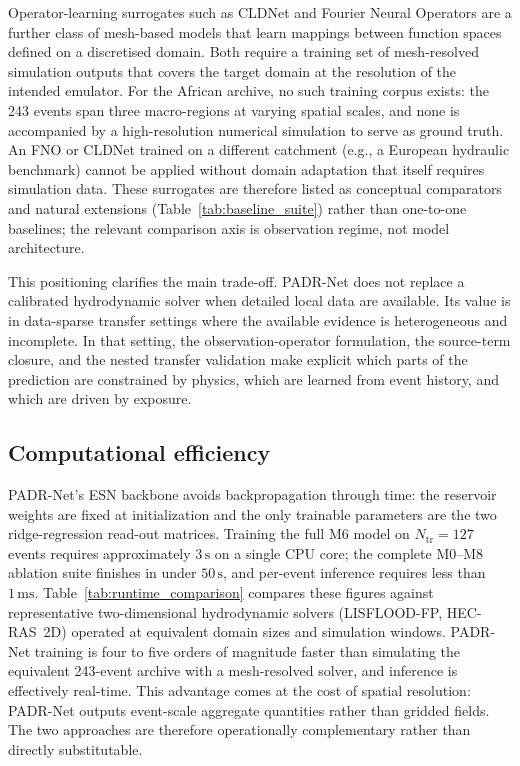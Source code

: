 \documentclass[pdflatex,sn-mathphys-ay]{sn-jnl}
\theoremstyle{thmstyleone}
\begin{document}
Operator-learning surrogates such as CLDNet
\citep[e.g.,][]{YANG2026103056} and Fourier Neural Operators
\citep{li2021fourier} are a further class of mesh-based models that
learn mappings between function spaces defined on a discretised domain.
Both require a training set of mesh-resolved simulation outputs that
covers the target domain at the resolution of the intended emulator.
For the African archive, no such training corpus exists: the 243 events
span three macro-regions at varying spatial scales, and none is
accompanied by a high-resolution numerical simulation to serve as
ground truth.  An FNO or CLDNet trained on a different catchment (e.g.,
a European hydraulic benchmark) cannot be applied without domain
adaptation that itself requires simulation data.  These surrogates are
therefore listed as conceptual comparators and natural extensions
(Table~\ref{tab:baseline_suite}) rather than one-to-one baselines;
the relevant comparison axis is observation regime, not model
architecture.

This positioning clarifies the main trade-off.  PADR-Net does not
replace a calibrated hydrodynamic solver when detailed local data are
available.  Its value is in data-sparse transfer settings where the
available evidence is heterogeneous and incomplete.  In that setting,
the observation-operator formulation, the source-term closure, and the
nested transfer validation make explicit which parts of the prediction
are constrained by physics, which are learned from event history, and
which are driven by exposure.

\subsection{Computational efficiency}
\label{subsec:runtime}

PADR-Net's ESN backbone avoids backpropagation through time: the
reservoir weights are fixed at initialization and the only trainable
parameters are the two ridge-regression read-out matrices.  Training
the full M6 model on $N_{\mathrm{tr}}=127$ events requires approximately
$3\,\mathrm{s}$ on a single CPU core; the complete M0--M8 ablation suite
finishes in under $50\,\mathrm{s}$, and per-event inference requires
less than $1\,\mathrm{ms}$.
Table~\ref{tab:runtime_comparison} compares these figures against
representative two-dimensional hydrodynamic solvers (LISFLOOD-FP,
HEC-RAS~2D) operated at equivalent domain sizes and simulation
windows.  PADR-Net training is four to five orders of magnitude faster
than simulating the equivalent 243-event archive with a mesh-resolved
solver, and inference is effectively real-time.  This advantage comes
at the cost of spatial resolution: PADR-Net outputs event-scale
aggregate quantities rather than gridded fields.  The two approaches
are therefore operationally complementary rather than directly
substitutable.
\end{document}
